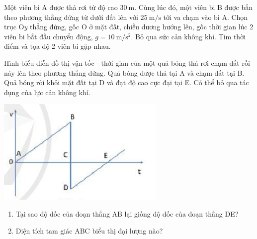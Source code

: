 \begin{ex}
	Một viên bi A được thả rơi từ độ cao $\SI{30}{\meter}$. Cùng lúc đó, một viên bi B được bắn theo phương thẳng đứng từ dưới đất lên với $\SI{25}{\meter/\second}$ tới va chạm vào bi A. Chọn trục O$y$ thẳng đứng, gốc O ở mặt đất, chiều dương hướng lên, gốc thời gian lúc 2 viên bi bắt đầu chuyển động, $g=\SI{10}{\meter/\second^2}$. Bỏ qua sức cản không khí. Tìm thời điểm và tọa độ 2 viên bi gặp nhau.
\end{ex}

\begin{ex}
	Hình biểu diễn đồ thị vận tốc - thời gian của một quả bóng thả rơi chạm đất rồi nảy lên theo phương thẳng đứng. Quả bóng được thả tại A và chạm đất tại B. Quả bóng rời khỏi mặt đất tại D và đạt độ cao cực đại tại E. Có thể bỏ qua tác dụng của lực cản không khí.
	\begin{center}
		\includegraphics[scale=1]{figs/G10Y25B7-3}
	\end{center}
	
	\begin{enumerate}[label=\alph*)]
		\item Tại sao độ dốc của đoạn thẳng AB lại giống độ dốc của đoạn thẳng DE?
		\item Diện tích tam giác ABC biểu thị đại lượng nào?
	\end{enumerate}
\end{ex}
	